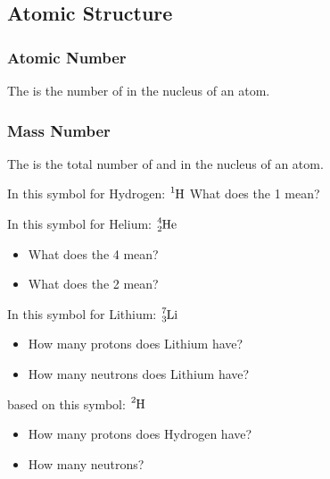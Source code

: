 \documentclass[12pt]{exam}
\begin{document}
    
\begin{questions}
        
\section{Atomic Structure}

\subsubsection{Atomic Number}


\question The  is the number of \fillin[protons][3cm] in the nucleus of an atom.

\subsubsection{Mass Number}

\question The  is the total number of \fillin[protons][2cm] and \fillin[neutrons][2cm]in the nucleus of an atom.


\question In this symbol for Hydrogen: $\ce{^{1}_{}H}$ What does the 1 mean?


\question In this symbol for Helium: $\ce{^{4}_{2}He}$ 

\begin{itemize}
  \item What does the 4 mean? 
  \item What does the 2 mean? \fillin[\# of neutrons][2cm]
\end{itemize} 


\question In this symbol for Lithium: $\ce{^{7}_{3}Li}$

\begin{itemize}
  \item How many protons does Lithium have? \fillin[3][2cm]
  \item How many neutrons does Lithium have? \fillin[7 - 3 = 4][2cm]
\end{itemize}

\question based on this symbol: $\ce{^{2}_{}H}$

\begin{itemize}
  \item How many protons does Hydrogen have? \fillin[1][1cm]
  \item How many neutrons? \fillin[1][1cm]
\end{itemize}





\end{questions}
\end{document}
